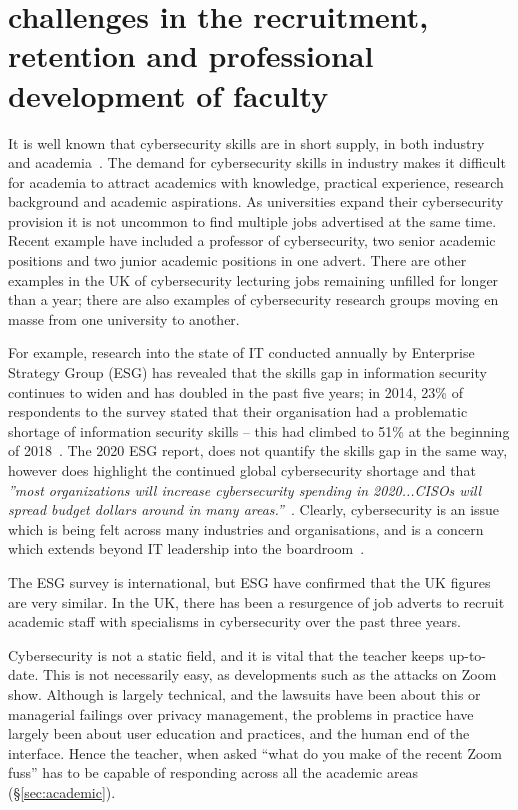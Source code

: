 \documentclass[conference]{IEEEtran}
\begin{document}
\section{challenges in the recruitment, retention and professional development of faculty}\label{sec:staff}
It is well known that cybersecurity skills are in short supply, in both industry~\cite{Ackerman2019a} and academia~\cite{schneider2013,endicott2018searching}. The demand for cybersecurity skills in industry makes it difficult for academia to attract academics with knowledge, practical experience, research background and academic aspirations. As universities expand their cybersecurity provision it is not uncommon to find multiple jobs advertised at the same time. Recent example have included a professor of cybersecurity, two senior academic positions and two junior academic positions in one advert. There are other examples in the UK of cybersecurity lecturing jobs remaining unfilled for longer than a year; there are also examples of cybersecurity research groups moving en masse from one university to another.

For example, research into the state of IT conducted annually by Enterprise Strategy Group (ESG) has revealed that the skills gap in information security continues to widen and has doubled in the past five years; in 2014, 23\% of respondents to the survey stated that their organisation had a problematic shortage of information security skills -- this had climbed to 51\% at the beginning of 2018~\cite{ESG:2018}. The 2020 ESG report, does not quantify the skills gap in the same way, however does highlight the continued global cybersecurity shortage and that {\em''most organizations will increase cybersecurity spending in 2020...CISOs will spread budget dollars around in many areas.''}~\cite[p.1]{ESG:2020}. Clearly, cybersecurity is an issue which is being felt across many industries and organisations, and is a concern which extends beyond IT leadership into the boardroom~\cite{Ackerman2019a}.

The ESG survey is international, but ESG have confirmed that the UK figures are very similar. In the UK, there has been a resurgence of job adverts to recruit academic staff with specialisms in cybersecurity over the past three years.

Cybersecurity is not a static field, and it is vital that the teacher keeps up-to-date. This is not necessarily easy, as developments such as the attacks on Zoom \cite[etc.]{MarczakScottRailton2020a} show. Although \cite{MarczakScottRailton2020a} is largely technical, and the lawsuits \cite[etc.]{Dame2020b} have been about this or managerial failings over privacy management, the problems in practice \cite{Abrams2020a,Culafi2020e} have largely been about user education and practices, and the human end of the interface. Hence the teacher, when asked ``what do you make of the recent Zoom fuss'' has to be capable of responding across all the academic areas (\S\ref{sec:academic}).
\end{document}
